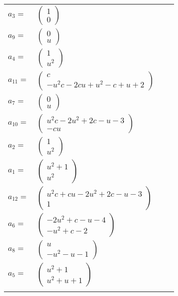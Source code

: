 \documentclass[1p]{elsarticle_modified}
\theoremstyle{definition}
\begin{document}
\begin{tabular}{m{7pt} m{180pt} m{7pt} m{180pt} }
\flushright $a_{3}=$&$\begin{pmatrix}1\\0\end{pmatrix}$ \\
\flushright $a_{9}=$&$\begin{pmatrix}0\\u\end{pmatrix}$ \\
\flushright $a_{4}=$&$\begin{pmatrix}1\\u^2\end{pmatrix}$ \\
\flushright $a_{11}=$&$\begin{pmatrix}c\\- u^2 c-2 c u+u^2- c+u+2\end{pmatrix}$ \\
\flushright $a_{7}=$&$\begin{pmatrix}0\\u\end{pmatrix}$ \\
\flushright $a_{10}=$&$\begin{pmatrix}u^2 c-2 u^2+2 c- u-3\\- c u\end{pmatrix}$ \\
\flushright $a_{2}=$&$\begin{pmatrix}1\\u^2\end{pmatrix}$ \\
\flushright $a_{1}=$&$\begin{pmatrix}u^2+1\\u^2\end{pmatrix}$ \\
\flushright $a_{12}=$&$\begin{pmatrix}u^2 c+c u-2 u^2+2 c- u-3\\1\end{pmatrix}$ \\
\flushright $a_{6}=$&$\begin{pmatrix}-2 u^2+c- u-4\\- u^2+c-2\end{pmatrix}$ \\
\flushright $a_{8}=$&$\begin{pmatrix}u\\- u^2- u-1\end{pmatrix}$ \\
\flushright $a_{5}=$&$\begin{pmatrix}u^2+1\\u^2+u+1\end{pmatrix}$\\&\end{tabular}
\end{document}

